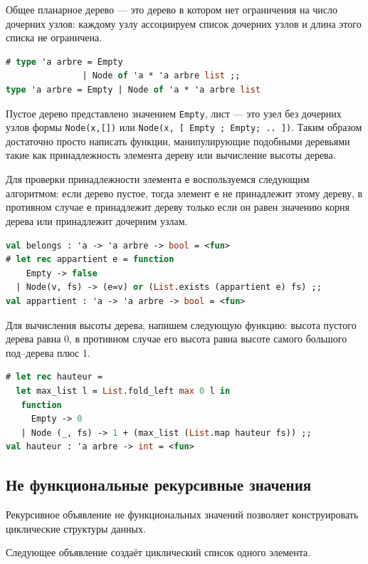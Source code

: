 Общее планарное дерево --- это дерево в котором нет ограничения на число
дочерних узлов: каждому узлу ассоциируем список дочерних узлов и длина этого
списка не ограничена.

\begin{lstlisting}[language=OCaml]
# type 'a arbre = Empty
               | Node of 'a * 'a arbre list ;;
type 'a arbre = Empty | Node of 'a * 'a arbre list
\end{lstlisting}

Пустое дерево представлено значением \texttt{Empty}, лист --- это узел без
дочерних узлов формы \texttt{Node(х,[])} или \texttt{Node(x, [
Empty ; Empty; .. ])}. Таким образом достаточно просто написать функции,
манипулирующие подобными деревьями такие как принадлежность элемента дереву или
вычисление высоты дерева.

Для проверки принадлежности элемента \texttt{e} воспользуемся следующим
алгоритмом: если дерево пустое, тогда элемент \texttt{e} не принадлежит этому
дереву, в противном случае \texttt{e} принадлежит дереву только если он равен
значению корня дерева или принадлежит дочерним узлам.

\begin{lstlisting}[language=OCaml]
val belongs : 'a -> 'a arbre -> bool = <fun>
# let rec appartient e = function
    Empty -> false
  | Node(v, fs) -> (e=v) or (List.exists (appartient e) fs) ;;
val appartient : 'a -> 'a arbre -> bool = <fun>
\end{lstlisting}

Для вычисления высоты дерева, напишем следующую функцию: высота пустого дерева
равна 0, в противном случае его высота равна высоте самого большого под--дерева
плюс 1.

\begin{lstlisting}[language=OCaml]
# let rec hauteur =
  let max_list l = List.fold_left max 0 l in
   function
     Empty -> 0
   | Node (_, fs) -> 1 + (max_list (List.map hauteur fs)) ;;
val hauteur : 'a arbre -> int = <fun>
\end{lstlisting}

\subsection{Не функциональные рекурсивные значения}

Рекурсивное объявление не функциональных значений позволяет конструировать
циклические структуры данных.

Следующее объявление создаёт циклический список одного элемента.

